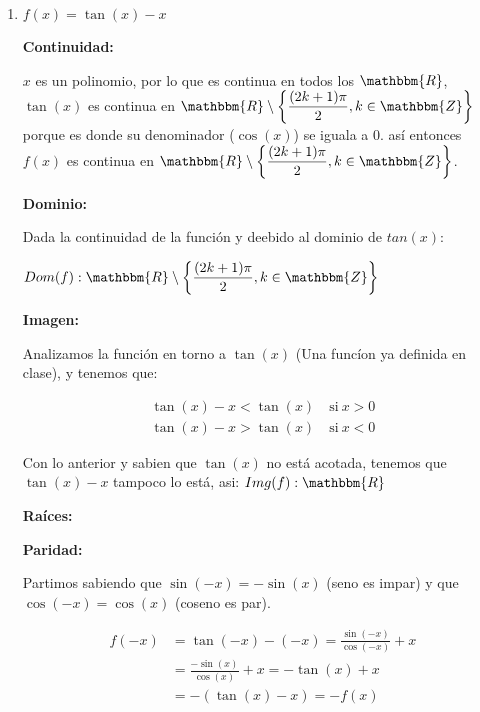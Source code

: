 \documentclass[12pt]{article}
\begin{document}
\begin{enumerate}[\hspace{9px} a)]
    \item \(f(x)=\tan(x)-x\)\bigskip
    
        \textbf{Continuidad: }\medskip

            $x$ es un polinomio, por lo que es continua en todos los $\mathbbm{R}$, \(\tan(x)\) es continua en \(\mathbbm{R}\setminus\displaystyle\left\{\frac{(2k+1)\pi}{2}, k\in\mathbbm{Z}\right\}\) porque es donde su denominador (\(\cos(x)\)) se iguala a 0. as\'i entonces \(f(x)\) es continua en \(\mathbbm{R}\setminus\displaystyle\left\{\frac{(2k+1)\pi}{2}, k\in\mathbbm{Z}\right\}\).\bigskip
        
        \textbf{Dominio: }\medskip
            
            Dada la continuidad de la funci\'on y deebido al dominio de \(tan(x)\):\medskip

            \(Dom(f):\mathbbm{R}\setminus\displaystyle\left\{\frac{(2k+1)\pi}{2}, k\in\mathbbm{Z}\right\}\)\bigskip

        \textbf{Imagen: }\medskip

            Analizamos la funci\'on en torno a $\tan(x)$ (Una func\'ion ya definida en clase), y tenemos que:

            \begin{align*}
                \tan(x)-x<\tan(x) \quad \text{si} \ x>0\\
                \tan(x)-x>\tan(x) \quad \text{si} \ x<0
            \end{align*}

            Con lo anterior y sabien que \(\tan(x)\) no est\'a acotada, tenemos que \(\tan(x)-x\) tampoco lo est\'a, asi: \(Img(f): \mathbbm{R}\)\bigskip

        \textbf{Ra\'ices: }\medskip

        \textbf{Paridad: }\medskip

            Partimos sabiendo que \(\sin(-x)=-\sin(x)\) (seno es impar) y que \(\cos(-x)=\cos(x)\) (coseno es par).

            \begin{align*}
                f(-x)&=\tan(-x)-(-x)=\frac{\sin(-x)}{\cos(-x)}+x \\
                &= \frac{-\sin(x)}{\cos(x)}+x = -\tan(x)+x \\
                &= -(\tan(x)-x)= -f(x)
            \end{align*}


\end{enumerate}
\end{document}
